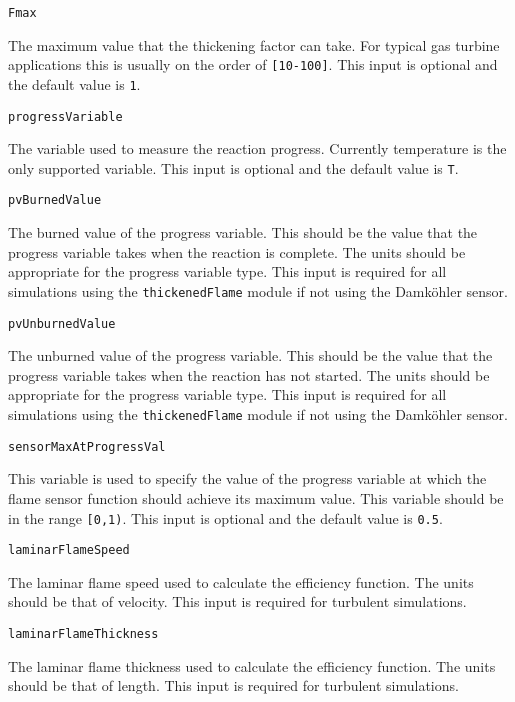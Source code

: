 \documentclass{article}
\begin{document}
  \begin{list}{}{}

    
  \item {\tt Fmax}

    The maximum value that the thickening factor can take. For typical gas turbine applications this is usually on the order of {\tt [10-100]}. This input is optional and the default value is {\tt 1}.
    
  \item {\tt progressVariable}
  
    The variable used to measure the reaction progress. Currently temperature is the only supported variable. This input is optional and the default value is {\tt T}.
  
  \item {\tt pvBurnedValue}
  
    The burned value of the progress variable. This should be the value that the progress variable takes when the reaction is complete. The units should be appropriate for the progress variable type. This input is required for all simulations using the {\tt thickenedFlame} module if not using the Damk\"ohler sensor.
  
  \item {\tt pvUnburnedValue}
  
    The unburned value of the progress variable. This should be the value that the progress variable takes when the reaction has not started. The units should be appropriate for the progress variable type. This input is required for all simulations using the {\tt thickenedFlame} module if not using the Damk\"ohler sensor.
    
  \item {\tt sensorMaxAtProgressVal}
      
    This variable is used to specify the value of the progress variable at which the flame sensor function should achieve its maximum value. This variable should be in the range {\tt [0,1)}. This input is optional and the default value is {\tt 0.5}.
  
  \item {\tt laminarFlameSpeed}
    
    The laminar flame speed used to calculate the efficiency function. The units should be that of velocity. This input is required for turbulent simulations.

  \item {\tt laminarFlameThickness}
  
	The laminar flame thickness used to calculate the efficiency function. The units should be that of length. This input is required for turbulent simulations.
	

\end{list}
\end{document}
